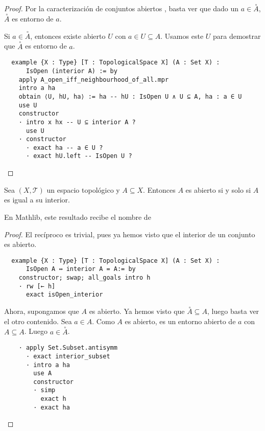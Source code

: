 \begin{proof}
  Por la caracterización de conjuntos abiertos , basta ver que dado un $a \in \overset{\circ}{A}$, $\overset{\circ}{A}$ es entorno de $a$.
  
  Si $a \in \overset{\circ}{A}$, entonces existe abierto $U$ con $a \in U \subseteq A$. Usamos este $U$ para demostrar que $\overset{\circ}{A}$ es entorno de $a$.

  \begin{lstlisting}
  example {X : Type} [T : TopologicalSpace X] (A : Set X) :
      IsOpen (interior A) := by
    apply A_open_iff_neighbourhood_of_all.mpr
    intro a ha
    obtain ⟨U, hU, ha⟩ := ha -- hU : IsOpen U ∧ U ⊆ A, ha : a ∈ U
    use U
    constructor
    · intro x hx -- U ⊆ interior A ?
      use U
    · constructor
      · exact ha -- a ∈ U ?
      · exact hU.left -- IsOpen U ?\end{lstlisting}
\end{proof}


\begin{proposition}
    Sea $(X, \mathcal{T})$ un espacio topológico y $A \subseteq X$. Entonces $A$ es abierto si y solo si $A$ es igual a su interior.
\end{proposition}

En Mathlib, este resultado recibe el nombre de 

\begin{proof}
  El recíproco es trivial, pues ya hemos visto que el interior de un conjunto es abierto.

  \begin{lstlisting}
  example {X : Type} [T : TopologicalSpace X] (A : Set X) :
      IsOpen A ↔ interior A = A:= by
    constructor; swap; all_goals intro h
    · rw [← h]
      exact isOpen_interior \end{lstlisting}

  Ahora, supongamos que $A$ es abierto. Ya hemos visto que $\overset{\circ}{A} \subseteq A$, luego basta ver el otro contenido. Sea $a \in A$. Como $A$ es abierto, es un entorno abierto de $a$ con $A \subseteq A$. Luego $a \in \overset{\circ}{A}$.
  
  \begin{lstlisting}
    · apply Set.Subset.antisymm
      · exact interior_subset
      · intro a ha
        use A
        constructor
        · simp
          exact h
        · exact ha \end{lstlisting}
\end{proof}


